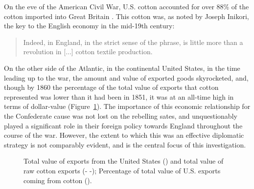 

\Autocites(Data in Figure~\ref{fig: B.i}:)()[Total exports:][Part 2, Table 2]{u.s.congressImportsduties1884}[Cotton exports:][Table A-III]{northeconomicgrowth1966}
On the eve of the American Civil War, U.S. cotton accounted for over 88\% of the cotton imported into Great Britain \autocite[40]{baileyOtherSide1994}. This 
cotton was, as noted by Joseph Inikori, the key to the English economy in the mid-19th century: 
\begin{quote}
    Indeed,  in England, in the strict sense of the phrase, is little more than a revolution in [...] cotton textile production.
    \autocite[Joseph Inikori, {The Slave Trade and Revolution in Cotton Textile Production in England}, quoted in][40]{baileyOtherSide1994}
\end{quote}
On the other side of the Atlantic, in the continental United States, in the time leading up to the war, the amount and value of exported goods skyrocketed, 
and, though by 1860 the percentage of the total value of exports that cotton represented was lower than it had been in 1851, it was at an all-time high in 
terms of dollar-value (Figure~\ref{fig: B.i}). The importance of this economic relationship for the Confederate cause was not lost on the rebelling sates, 
and unquestionably played a significant role in their foreign policy towards England throughout the course of the war. However, the extent to which this was an 
effective diplomatic strategy is not comparably evident, and is the central focus of this investigation. 

\begin{figure}[ht]
    \centering
    
    \caption{
        Total value of exports from the United States (\textemdash) 
        and total value of raw cotton exports (- -);
        Percentage of total value of U.S. exports coming from cotton (\textcolor{red!75!black}{\textemdash}).
    }
    \label{fig: B.i}
\end{figure} 

